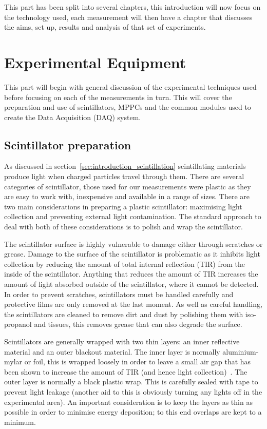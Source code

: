 This part has been split into several chapters, this introduction will now focus on the technology used, each measurement will then have a chapter that discusses the aims, set up, results and analysis of that set of experiments.

\section{Experimental Equipment} %
\label{sec:experimental_equipment}
This part will begin with general discussion of the experimental techniques used before focusing on each of the measurements in turn. This will cover the preparation and use of scintillators, MPPCs and the common modules used to create the Data Acquisition (DAQ) system.
\subsection{Scintillator preparation} %
\label{sub:scintillator_preparation}
As discussed in section~\ref{sec:introduction_scintillation} scintillating materials produce light when charged particles travel through them. There are several categories of scintillator, those used for our measurements were plastic as they are easy to work with, inexpensive and available in a range of sizes. There are two main considerations in preparing a plastic scintillator: maximising light collection and preventing external light contamination. The standard approach to deal with both of these considerations is to polish and wrap the scintillator.

The scintillator surface is highly vulnerable to damage either through scratches or grease. Damage to the surface of the scintillator is problematic as it inhibits light collection by reducing the amount of total internal reflection (TIR) from the inside of the scintillator. Anything that reduces the amount of TIR increases the amount of light absorbed outside of the scintillator, where it cannot be detected. In order to prevent scratches, scintillators must be handled carefully and protective films are only removed at the last moment. As well as careful handling, the scintillators are cleaned to remove dirt and dust by polishing them with iso-propanol and tissues, this removes grease that can also degrade the surface.

Scintillators are generally wrapped with two thin layers: an inner reflective material and an outer blackout material. The inner layer is normally aluminium-mylar or foil, this is wrapped loosely in order to leave a small air gap that has been shown to increase the amount of TIR (and hence light collection)~\cite{air gap to increase light collection}. The outer layer is normally a black plastic wrap. This is carefully sealed with tape to prevent light leakage (another aid to this is obviously turning any lights off in the experimental area). An important consideration is to keep the layers as thin as possible in order to minimise energy deposition; to this end overlaps are kept to a minimum.


